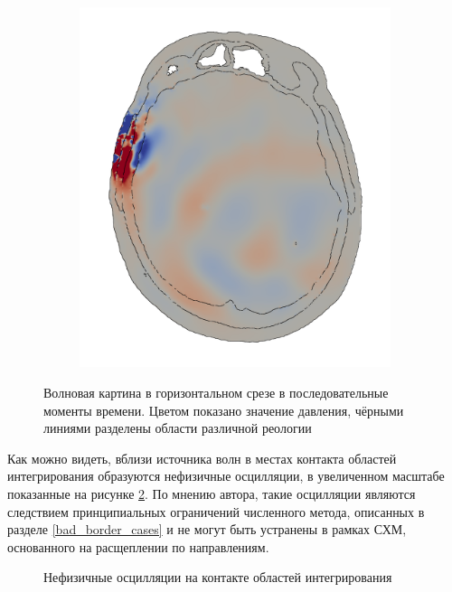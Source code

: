 \documentclass[a4paper]{article}
\numberwithin{equation}{section}
\begin{document}
\begin{figure}[H]
\begin{subfigure}{.18\textwidth}
\end{subfigure}
\begin{subfigure}{.18\textwidth}
  \centering
  \includegraphics[width=1.0\linewidth]{pictures/skull/elastic-pressure-z-with-bounds/six/5.png}
\end{subfigure}
\caption{Волновая картина в горизонтальном срезе в последовательные моменты времени. 
Цветом показано значение давления, чёрными линиями разделены области различной реологии}
\label{fig:waves-z}
\end{figure}

Как можно видеть, вблизи источника волн в местах контакта областей интегрирования 
образуются нефизичные осцилляции, в увеличенном масштабе показанные на рисунке 
\ref{pic:oscillations}. По мнению автора, 
такие осцилляции являются следствием принципиальных 
ограничений численного метода, описанных в разделе \ref{bad_border_cases} и 
не могут быть устранены в рамках СХМ, основанного на расщеплении по направлениям. 
\begin{figure}[H]
	\caption{Нефизичные осцилляции на контакте областей интегрирования}
	\label{pic:oscillations}
\end{figure}
\end{document}
